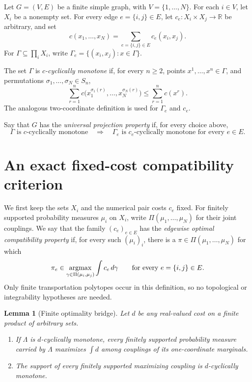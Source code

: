\documentclass[11pt]{article}
\newtheorem{lemma}[theorem]{Lemma}
\newcommand{\1}{\mathbf 1}
\begin{document}
Let $G=(V,E)$ be a finite simple graph, with $V=\{1,\ldots,N\}$.
For each $i\in V$, let $X_i$ be a nonempty set.  For every edge
$e=\{i,j\}\in E$, let $c_e:X_i\times X_j\to\mathbb R$ be arbitrary, and set
\begin{equation}\label{eq:cost}
 c(x_1,\ldots,x_N)=\sum_{e=\{i,j\}\in E}c_e(x_i,x_j).
\end{equation}
For $\Gamma\subseteq\prod_iX_i$, write
$\Gamma_e=\{(x_i,x_j):x\in\Gamma\}$.

The set $\Gamma$ is \emph{$c$-cyclically monotone} if, for every $n\ge2$,
points $x^1,\ldots,x^n\in\Gamma$, and permutations
$\sigma_1,\ldots,\sigma_N\in S_n$,
\begin{equation}\label{eq:globalcm}
 \sum_{r=1}^n c\bigl(x_1^{\sigma_1(r)},\ldots,
 x_N^{\sigma_N(r)}\bigr)
 \le \sum_{r=1}^n c(x^r).
\end{equation}
The analogous two-coordinate definition is used for $\Gamma_e$ and $c_e$.

Say that $G$ has the \emph{universal projection property} if, for every
choice above,
\[
 \Gamma\text{ is $c$-cyclically monotone}
 \quad\Longrightarrow\quad
 \Gamma_e\text{ is $c_e$-cyclically monotone for every }e\in E.
\]

\section{An exact fixed-cost compatibility criterion}

We first keep the sets $X_i$ and the numerical pair costs $c_e$ fixed.
For finitely supported probability measures $\mu_i$ on $X_i$, write
$\Pi(\mu_1,\ldots,\mu_N)$ for their joint couplings.  We say that the
family $(c_e)_{e\in E}$ has the \emph{edgewise optimal compatibility
property} if, for every such $(\mu_i)_i$, there is a
$\pi\in\Pi(\mu_1,\ldots,\mu_N)$ for which
\begin{equation}\label{eq:simopt}
 \pi_e\in\mathop{\rm argmax}_{\gamma\in\Pi(\mu_i,\mu_j)}
       \int c_e\,d\gamma
 \qquad\text{for every }e=\{i,j\}\in E.
\end{equation}
Only finite transportation polytopes occur in this definition, so no
topological or integrability hypotheses are needed.

\begin{lemma}[Finite optimality bridge]\label{lem:bridge}
Let $d$ be any real-valued cost on a finite product of arbitrary sets.
\begin{enumerate}[label=\textup{(\alph*)}]
\item If $\Lambda$ is $d$-cyclically monotone, every finitely supported
probability measure carried by $\Lambda$ maximizes $\int d$ among couplings
of its one-coordinate marginals.
\item The support of every finitely supported maximizing coupling is
$d$-cyclically monotone.
\end{enumerate}
\end{lemma}
\end{document}
